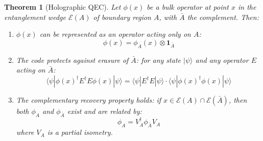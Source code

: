 \documentclass[12pt,a4paper]{article}
\newtheorem{theorem}{Theorem}[section]
\begin{document}
\begin{theorem}[Holographic QEC]\label{thm:holo-qec}
Let $\phi(x)$ be a bulk operator at point $x$ in the entanglement wedge $\mathcal{E}(A)$ of boundary region $A$, with $\bar{A}$ the complement. Then:
\begin{enumerate}
    \item $\phi(x)$ can be represented as an operator acting only on $A$:
    \begin{equation}
    \phi(x) = \phi_A(x) \otimes \mathbf{1}_{\bar{A}}
    \end{equation}
    
    \item The code protects against erasure of $\bar{A}$: for any state $|\psi\rangle$ and any operator $E$ acting on $\bar{A}$:
    \begin{equation}
    \langle\psi|\phi(x)^\dagger E^\dagger E \phi(x)|\psi\rangle = \langle\psi|E^\dagger E|\psi\rangle \cdot \langle\psi|\phi(x)^\dagger\phi(x)|\psi\rangle
    \end{equation}
    
    \item The complementary recovery property holds: if $x \in \mathcal{E}(A) \cap \mathcal{E}(\bar{A})$, then both $\phi_A$ and $\phi_{\bar{A}}$ exist and are related by:
    \begin{equation}
    \phi_A = V_A^\dagger \phi_{\bar{A}} V_A
    \end{equation}
    where $V_A$ is a partial isometry.
\end{enumerate}
\end{theorem}
\end{document}
